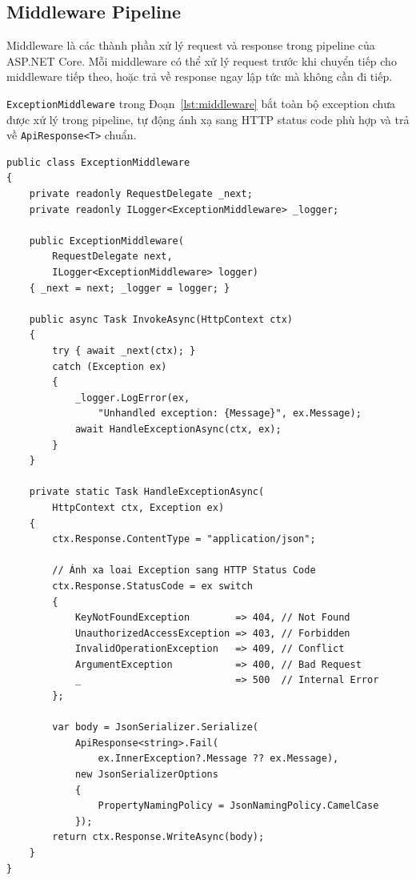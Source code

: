 \subsection{Middleware Pipeline}\label{sub3.2.2}

Middleware là các thành phần xử lý request và response trong
pipeline của ASP.NET Core. Mỗi middleware có thể xử lý request
trước khi chuyển tiếp cho middleware tiếp theo, hoặc trả về
response ngay lập tức mà không cần đi tiếp.

\texttt{ExceptionMiddleware} trong Đoạn~\ref{lst:middleware}
bắt toàn bộ exception chưa được xử lý trong pipeline, tự động
ánh xạ sang HTTP status code phù hợp và trả về
\texttt{ApiResponse<T>} chuẩn.

\begin{lstlisting}[style=csharp,
  caption={ExceptionMiddleware -- xử lý lỗi tập trung},
  label={lst:middleware}]
public class ExceptionMiddleware
{
    private readonly RequestDelegate _next;
    private readonly ILogger<ExceptionMiddleware> _logger;

    public ExceptionMiddleware(
        RequestDelegate next,
        ILogger<ExceptionMiddleware> logger)
    { _next = next; _logger = logger; }

    public async Task InvokeAsync(HttpContext ctx)
    {
        try { await _next(ctx); }
        catch (Exception ex)
        {
            _logger.LogError(ex,
                "Unhandled exception: {Message}", ex.Message);
            await HandleExceptionAsync(ctx, ex);
        }
    }

    private static Task HandleExceptionAsync(
        HttpContext ctx, Exception ex)
    {
        ctx.Response.ContentType = "application/json";

        // Ánh xa loai Exception sang HTTP Status Code
        ctx.Response.StatusCode = ex switch
        {
            KeyNotFoundException        => 404, // Not Found
            UnauthorizedAccessException => 403, // Forbidden
            InvalidOperationException   => 409, // Conflict
            ArgumentException           => 400, // Bad Request
            _                           => 500  // Internal Error
        };

        var body = JsonSerializer.Serialize(
            ApiResponse<string>.Fail(
                ex.InnerException?.Message ?? ex.Message),
            new JsonSerializerOptions
            {
                PropertyNamingPolicy = JsonNamingPolicy.CamelCase
            });
        return ctx.Response.WriteAsync(body);
    }
}
\end{lstlisting}


